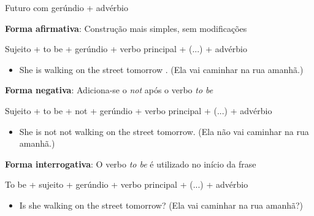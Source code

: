 \documentclass[compress,mathserif,xcolor=table]{beamer}
\begin{document}

\begin{frame}{Futuro com gerúndio + advérbio}

\textbf{Forma afirmativa}: Construção mais simples, sem modificações

Sujeito + to be + gerúndio + verbo principal + (...) + advérbio
\begin{itemize}
    \item She is walking on the street tomorrow . (Ela vai caminhar na rua amanhã.)
\end{itemize}

\vspace{0.25cm}

\textbf{Forma negativa}: Adiciona-se o \textit{not} após o verbo \textit{to be}

Sujeito + to be + not + gerúndio + verbo principal + (...) + advérbio
\begin{itemize}
    \item She is not not walking on the street tomorrow. (Ela não vai caminhar na rua amanhã.)
\end{itemize}

\vspace{0.25cm}

\textbf{Forma interrogativa}: O verbo \textit{to be} é utilizado no início da frase

To be + sujeito + gerúndio + verbo principal + (...) + advérbio
\begin{itemize}
    \item Is she walking on the street tomorrow? (Ela vai caminhar na rua amanhã?)
\end{itemize}

\end{frame}
\end{document}
